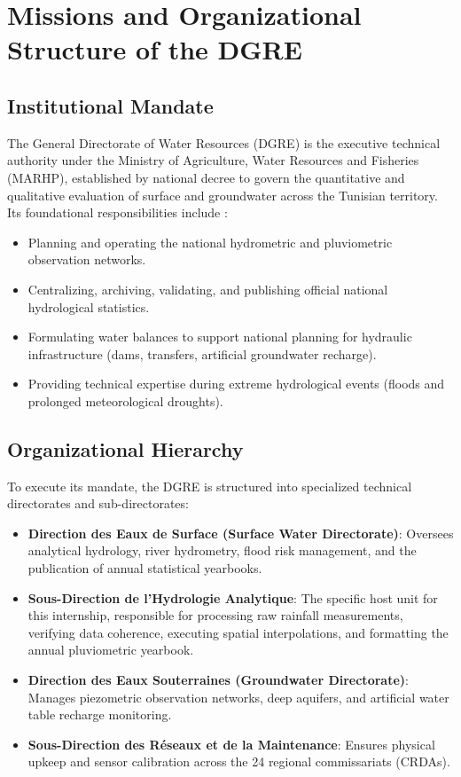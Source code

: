 \documentclass[12pt,a4paper]{report}
\begin{document}
\section{Missions and Organizational Structure of the DGRE}

\subsection{Institutional Mandate}
The General Directorate of Water Resources (DGRE) is the executive technical authority under the Ministry of Agriculture, Water Resources and Fisheries (MARHP), established by national decree \cite{jort2001} to govern the quantitative and qualitative evaluation of surface and groundwater across the Tunisian territory. Its foundational responsibilities include \cite{dgre2023}:
\begin{itemize}
  \item Planning and operating the national hydrometric and pluviometric observation networks.
  \item Centralizing, archiving, validating, and publishing official national hydrological statistics.
  \item Formulating water balances to support national planning for hydraulic infrastructure (dams, transfers, artificial groundwater recharge).
  \item Providing technical expertise during extreme hydrological events (floods and prolonged meteorological droughts).
\end{itemize}

\subsection{Organizational Hierarchy}
To execute its mandate, the DGRE is structured into specialized technical directorates and sub-directorates:
\begin{itemize}
  \item \textbf{Direction des Eaux de Surface (Surface Water Directorate)}: Oversees analytical hydrology, river hydrometry, flood risk management, and the publication of annual statistical yearbooks.
  \item \textbf{Sous-Direction de l'Hydrologie Analytique}: The specific host unit for this internship, responsible for processing raw rainfall measurements, verifying data coherence, executing spatial interpolations, and formatting the annual pluviometric yearbook.
  \item \textbf{Direction des Eaux Souterraines (Groundwater Directorate)}: Manages piezometric observation networks, deep aquifers, and artificial water table recharge monitoring.
  \item \textbf{Sous-Direction des Réseaux et de la Maintenance}: Ensures physical upkeep and sensor calibration across the 24 regional commissariats (CRDAs).
\end{itemize}
\end{document}
